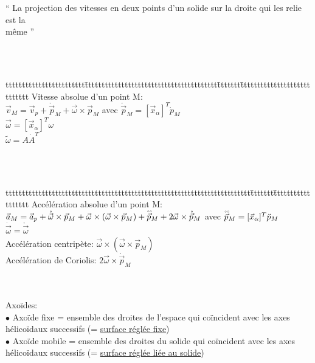 \begin{orangebox}
“ La {\color{orange}projection} des vitesses en deux points d’un solide sur la droite qui les relie est la\\ même ”
\end{orangebox}\\\\

\begin{bluebox}
\begin{tabbing}
tttttttttttttttttttttttt\=tttttttttttttttttttttttttttttttttttttttt\=ttttttt\=tttttttttttttttttttttttttttt\kill
Vitesse absolue d'un point M: \\
\>$\vec{v}_M = \vec{v}_p+\mathring{\vec{p}}_M+\vec{\omega}\times\vec{p}_M$ \> avec \>$\mathring{\vec{p}}_M = [\vec{x}_\alpha]^T\dot{p}_M$\\
\>\>\>$\vec{\omega} = [\vec{x}_\alpha]^T\omega$\\
\>\>\>$\tilde{\omega} = A\dot{A}^T$
\end{tabbing}
\end{bluebox}\\\\

\begin{bluebox}
\begin{tabbing}
tttttttttttttttttttttttttttttttttttttttttttttttttttttttttttttttttttttttttt\=ttttttt\=tttttttttttttttttt\kill
Accélération absolue d'un point M: \\
$\vec{a}_M = \vec{a}_p+\mathring{\vec{\omega}}\times\vec{p}_M+\vec{\omega}\times(\vec{\omega}\times\vec{p}_M)+\mecacc{\vec{p}}_M+2\vec{\omega}\times\mathring{\vec{p}}_M$ \> avec \>$\mecacc{\vec{p}}_M = [\vec{x}_\alpha]^T\ddot{p}_M$\\
\>\>$\dot{\vec{\omega}} = \mathring{\vec{\omega}}$\\
Accélération centripète: $\vec{\omega}\times(\vec{\omega}\times\vec{p}_M)$\\
Accélération de Coriolis: $2\vec{\omega}\times\mathring{\vec{p}}_M$
\end{tabbing}
\end{bluebox}\\\\

Axoïdes:\\
$\bullet$ {\color{orange}Axoïde fixe} = ensemble des droites de {\color{orange}l’espace} qui coïncident avec les axes hélicoïdaux successifs (= \underline{surface réglée fixe})\\
$\bullet$ {\color{orange}Axoïde mobile} = ensemble des droites du {\color{orange}solide} qui coïncident avec les axes hélicoïdaux successifs (= \underline{surface réglée liée au solide})\\

